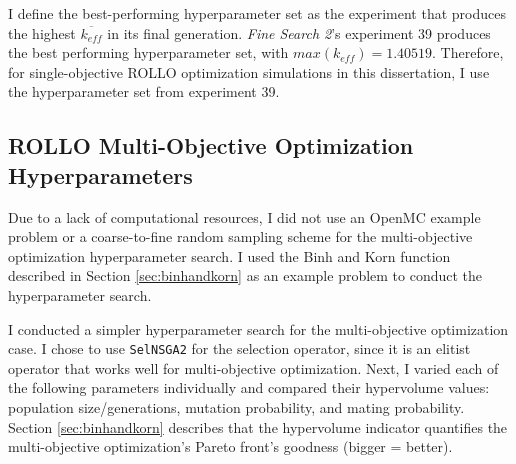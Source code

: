 I define the best-performing hyperparameter set as the experiment that produces 
the highest $\overline{k_{eff}}$ in its final generation. 
\textit{Fine Search 2}'s experiment 39 produces the best performing 
hyperparameter set, with $max(k_{eff}) = 1.40519$. 
Therefore, for single-objective ROLLO optimization simulations in this dissertation, 
I use the hyperparameter set from experiment 39. 

\subsection{ROLLO Multi-Objective Optimization Hyperparameters}
\label{sec:multi-obj-hyperparameters}
Due to a lack of computational resources, I did not use an OpenMC example problem or 
a coarse-to-fine random sampling scheme for the multi-objective optimization 
hyperparameter search.
I used the Binh and Korn function described in Section \ref{sec:binhandkorn} as 
an example problem to conduct the hyperparameter search.

I conducted a simpler hyperparameter search for the multi-objective optimization case. 
I chose to use \texttt{SelNSGA2} for the selection operator, since it is an elitist 
operator that works well for multi-objective optimization. 
Next, I varied each of the following parameters individually and compared their 
hypervolume values: population size/generations, mutation probability, and mating 
probability.
Section \ref{sec:binhandkorn} describes that the hypervolume indicator quantifies 
the multi-objective optimization's Pareto front's goodness (bigger = better). 

